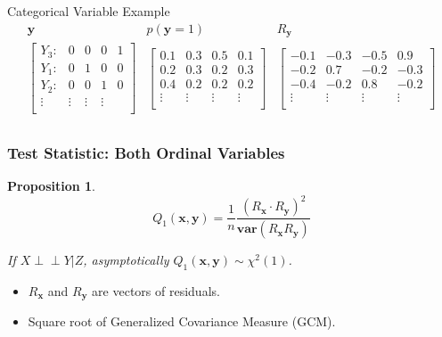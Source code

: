 \documentclass{beamer}
\def\ci{\perp\!\!\!\!\!\perp}
\newtheorem{proposition}{Proposition}
\begin{document}
\begin{frame}
	\begin{block}{Categorical Variable Example}
		\begin{equation*}
		\begin{array}{ccc}
			\bm{y} & \hat{p}(\bm{y}=1) & R_{\bm{y}} \\
			\begin{bmatrix}
				Y_3: & 0 & 0 & 0 & 1 \\
				Y_1: & 0 & 1 & 0 & 0 \\
				Y_2: & 0 & 0 & 1 & 0 \\
				\vdots & \vdots & \vdots & \vdots \\
			\end{bmatrix} & 
			\begin{bmatrix}
				0.1 & 0.3 & 0.5 & 0.1 \\
				0.2 & 0.3 & 0.2 & 0.3 \\
				0.4 & 0.2 & 0.2 & 0.2 \\
				\vdots & \vdots & \vdots & \vdots \\
			\end{bmatrix} & 
			\begin{bmatrix}
				-0.1 & -0.3 & -0.5 & 0.9 \\
				-0.2 & 0.7 & -0.2& -0.3 \\
				-0.4 & -0.2 & 0.8 & -0.2 \\
				\vdots & \vdots & \vdots & \vdots \\
			\end{bmatrix} \\
		\end{array}
		\end{equation*}	
	\end{block}
\end{frame}

\begin{frame}
	\frametitle{Test Statistic: Both Ordinal Variables}
	\begin{proposition}
	$$ Q_1(\bm{x}, \bm{y}) = \frac{1}{n} \frac{(R_{\bm{x}} \cdot R_{\bm{y}})^2}{\bm{var}(R_{\bm{x}} R_{\bm{y}})} $$
		\begin{center} If $ X \ci Y | Z $, asymptotically $ Q_1(\bm{x}, \bm{y}) \sim \chi^2(1) $. \end{center}
	\end{proposition}
	\begin{center}
		\begin{itemize}
			\item $ R_{\bm{x}} $ and $ R_{\bm{y}} $ are vectors of residuals.
			\item Square root of Generalized Covariance Measure (GCM)\footnotemark.
		\end{itemize}
	\end{center}
\end{frame}
\end{document}

